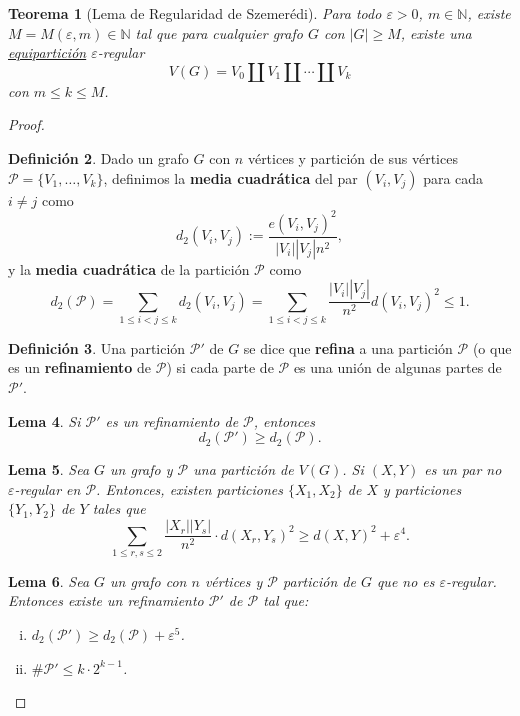 \documentclass[12pt]{report}
\theoremstyle{plain}
\newtheorem{theorem}{Teorema}[section]
\newtheorem{lemma}[theorem]{Lema}
\theoremstyle{definition}
\newtheorem{definition}[theorem]{Definición}
\newcommand{\naturals}{\mathbb{N}}
\newcommand{\abs}[1]{\left \vert #1 \right \vert}
\begin{document}
\begin{theorem}[Lema de Regularidad de Szemerédi]\label{theorem:lema de regularidad de szemeredi}
Para todo $\varepsilon > 0$, $m \in \naturals$, existe $M = M (\varepsilon, m) \in \naturals$ tal que para cualquier grafo $G$ con $\abs G \geq M$, existe una \underline{equipartición} $\varepsilon$-regular
\[
    V(G) = V_0 \coprod V_1 \coprod \cdots \coprod V_k
\]
con $m \leq k \leq M$.
\end{theorem}
\begin{proof}
\begin{definition}
Dado un grafo $G$ con $n$ vértices y partición de sus vértices $\mathcal P = \{ V_1, \ldots, V_k \}$, definimos la \textbf{media cuadrática} del par $(V_i,V_j)$ para cada $i\neq j$ como
\[
    d_2 (V_i , V_j) := \frac{e(V_i,V_j)^2}{\abs{V_i} \abs {V_j} n^2},
\]
y la \textbf{media cuadrática} de la partición $\mathcal P$ como
\[
    d_2 (\mathcal P) = \sum_{1 \leq i < j \leq k} d_2 (V_i, V_j) = \sum_{1 \leq i < j \leq k} \frac {\abs {V_i} \abs{ V_j}}{n^2} d(V_i, V_j)^2 \leq 1.
\]
\end{definition}

\begin{definition}
Una partición $\mathcal P'$ de $G$ se dice que \textbf{refina} a una partición $\mathcal P$ (o que es un \textbf{refinamiento} de $\mathcal P$) si cada parte de $\mathcal P$ es una unión de algunas partes de $\mathcal P'$.
\end{definition}

\begin{lemma}
Si $\mathcal P'$ es un refinamiento de $\mathcal P$, entonces
\[
d_2 (\mathcal P') \geq d_2 (\mathcal P).
\]
\end{lemma}

\begin{lemma}
Sea $G$ un grafo y $\mathcal P$ una partición de $V(G)$. Si $(X,Y)$ es un par no $\varepsilon$-regular en $\mathcal P$. Entonces, existen particiones $\{X_1, X_2\}$ de $X$ y particiones $\{Y_1, Y_2\}$ de $Y$ tales que
\[
\sum_{1 \leq r, s \leq 2} \frac{\abs{X_r} \abs{Y_s}}{n^2} \cdot d(X_r, Y_s)^2 \geq d(X,Y)^2 + \varepsilon^4.
\]
\end{lemma}

\begin{lemma}
Sea $G$ un grafo con $n$ vértices y $\mathcal P$ partición de $G$ que no es $\varepsilon$-regular. Entonces existe un refinamiento $\mathcal P'$ de $\mathcal P$ tal que:
\begin{enumerate}[(i)]
\item $d_2 (\mathcal P') \geq d_2 (\mathcal P) + \varepsilon^5$.
\item $\# \mathcal P ' \leq k \cdot 2^{k-1}$.
\end{enumerate}
\end{lemma}


\end{proof}
\end{document}
